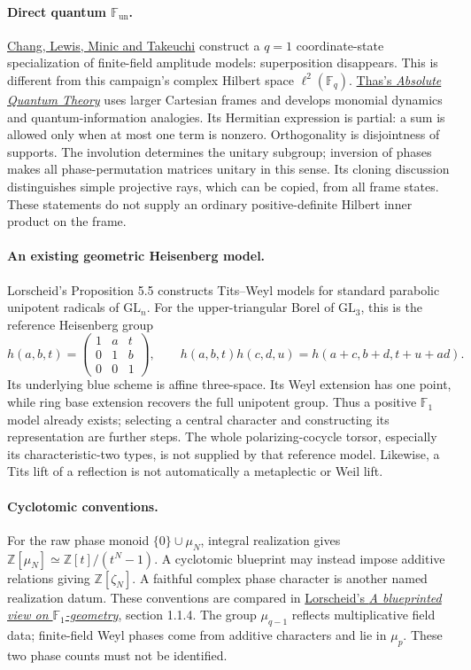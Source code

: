 \paragraph{Direct quantum $\mathbb F_{\mathrm{un}}$.}
\href{https://arxiv.org/abs/1312.4191}{Chang, Lewis, Minic and Takeuchi}
construct a $q=1$ coordinate-state specialization of finite-field amplitude
models: superposition disappears. This is different from this campaign's
complex Hilbert space $\ell^2(\mathbb F_q)$.
\href{https://arxiv.org/abs/1808.09694}{Thas's \emph{Absolute Quantum Theory}}
uses larger Cartesian frames and develops monomial dynamics and
quantum-information analogies. Its Hermitian expression is partial: a sum
is allowed only when at most one term is nonzero. Orthogonality is
disjointness of supports. The involution determines the unitary subgroup;
inversion of phases makes all phase-permutation matrices unitary in this
sense. Its cloning discussion distinguishes simple projective rays, which
can be copied, from all frame states. These statements do not supply an
ordinary positive-definite Hilbert inner product on the frame.

\paragraph{An existing geometric Heisenberg model.}
Lorscheid's Proposition 5.5 constructs Tits--Weyl models for standard
parabolic unipotent radicals of $\mathrm{GL}_n$. For the upper-triangular
Borel of $\mathrm{GL}_3$, this is the reference Heisenberg group
\[
h(a,b,t)=\begin{pmatrix}1&a&t\\0&1&b\\0&0&1\end{pmatrix},\qquad
h(a,b,t)h(c,d,u)=h(a+c,b+d,t+u+ad).
\]
Its underlying blue scheme is affine three-space. Its Weyl extension has
one point, while ring base extension recovers the full unipotent group.
Thus a positive $\mathbb F_1$ model already exists; selecting a central
character and constructing its representation are further steps. The
whole polarizing-cocycle torsor, especially its characteristic-two types,
is not supplied by that reference model. Likewise, a Tits lift of a
reflection is not automatically a metaplectic or Weil lift.

\paragraph{Cyclotomic conventions.}
For the raw phase monoid $\{0\}\cup\mu_N$, integral realization gives
$\mathbb Z[\mu_N]\simeq\mathbb Z[t]/(t^N-1)$. A cyclotomic blueprint may
instead impose additive relations giving $\mathbb Z[\zeta_N]$.
A faithful complex phase character is another named realization datum.
These conventions are compared in
\href{https://arxiv.org/abs/1301.0083}{Lorscheid's \emph{A blueprinted view
on $\mathbb F_1$-geometry}}, section 1.1.4. The group $\mu_{q-1}$ reflects
multiplicative field data; finite-field Weyl phases come from additive
characters and lie in $\mu_p$. These two phase counts must not be identified.

